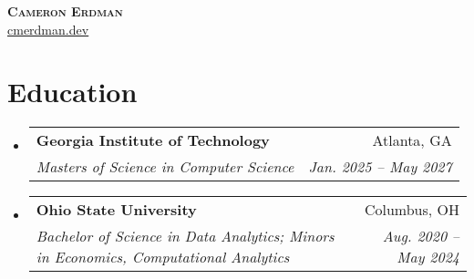 \documentclass[letterpaper,11pt]{article}
\makeatletter
\newcommand{\resumeSubheading}[4]{
  \vspace{-2pt}\item
    \begin{tabular*}{0.97\textwidth}[t]{l@{\extracolsep{\fill}}r}
      \textbf{#1} & #2 \\
      \textit{\small#3} & \textit{\small #4} \\
    \end{tabular*}\vspace{-7pt}
}
\newcommand{\resumeSubHeadingListStart}{\begin{itemize}[leftmargin=0.15in, label={}]}
\newcommand{\resumeSubHeadingListEnd}{\end{itemize}}
\makeatother
\begin{document}
\begin{center}
    \textbf{\Huge \scshape Cameron Erdman} \\ \vspace{1pt}
    \href{https://cmerdman.dev}{\underline{cmerdman.dev}} 
\end{center}


\section{Education}
  \resumeSubHeadingListStart
    \resumeSubheading
      {Georgia Institute of Technology}{Atlanta, GA}
      {Masters of Science in Computer Science}{Jan. 2025 -- May 2027}
    \resumeSubheading
      {Ohio State University}{Columbus, OH}
      {Bachelor of Science in Data Analytics; Minors in Economics, Computational Analytics}{Aug. 2020 -- May 2024}
  \resumeSubHeadingListEnd


\end{document}
